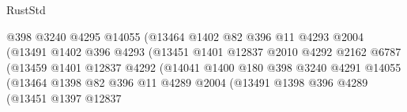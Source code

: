 \begin{lexlean}{RustStd}
\begin{coremodule}
{\begin{coremodule}
{{{{{{{{{{{{{{{{{{{{{{{{{{{{{{{                                          @398
                                          @3240
                                          @4295
                                          @14055
                                          (@13464
                                            @1402
                                            @82
                                            @396
                                            @11
                                            @4293
                                            @2004
                                            (@13491
                                              @1402
                                              @396
                                              @4293
                                              (@13451
                                                @1401
                                                @12837
                                                @2010
                                                @4292
                                                @2162
                                                @6787
                                                (@13459
                                                  @1401
                                                  @12837
                                                  @4292
                                                  (@14041
                                                    @1400
                                                    @180
                                                    @398
                                                    @3240
                                                    @4291
                                                    @14055
                                                    (@13464
                                                      @1398
                                                      @82
                                                      @396
                                                      @11
                                                      @4289
                                                      @2004
                                                      (@13491
                                                        @1398
                                                        @396
                                                        @4289
                                                        (@13451
                                                          @1397
                                                          @12837
}}}}}}}}}}}}}}}}}}}}}}}}}}}}}}}
\end{coremodule}}
\end{coremodule}
\end{lexlean}
